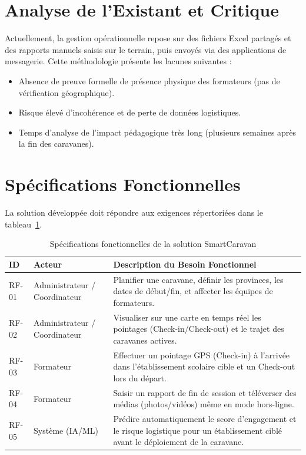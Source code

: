 \documentclass[12pt,a4paper]{report}
\begin{document}
\section{Analyse de l'Existant et Critique}
Actuellement, la gestion opérationnelle repose sur des fichiers Excel partagés et des rapports manuels saisis sur le terrain, puis envoyés via des applications de messagerie. Cette méthodologie présente les lacunes suivantes :
\begin{itemize}
    \item Absence de preuve formelle de présence physique des formateurs (pas de vérification géographique).
    \item Risque élevé d'incohérence et de perte de données logistiques.
    \item Temps d'analyse de l'impact pédagogique très long (plusieurs semaines après la fin des caravanes).
\end{itemize}

\section{Spécifications Fonctionnelles}
La solution développée doit répondre aux exigences répertoriées dans le tableau~\ref{tab:specs_fonc}.

\begin{table}[h]
\centering
\small
\renewcommand{\arraystretch}{1.3}
\begin{tabularx}{\textwidth}{@{} l p{4cm} X @{}}
\toprule
\textbf{ID} & \textbf{Acteur} & \textbf{Description du Besoin Fonctionnel} \\
\midrule
RF-01 & Administrateur / Coordinateur & Planifier une caravane, définir les provinces, les dates de début/fin, et affecter les équipes de formateurs. \\
RF-02 & Administrateur / Coordinateur & Visualiser sur une carte en temps réel les pointages (Check-in/Check-out) et le trajet des caravanes actives. \\
RF-03 & Formateur & Effectuer un pointage GPS (Check-in) à l'arrivée dans l'établissement scolaire cible et un Check-out lors du départ. \\
RF-04 & Formateur & Saisir un rapport de fin de session et téléverser des médias (photos/vidéos) même en mode hors-ligne. \\
RF-05 & Système (IA/ML) & Prédire automatiquement le score d'engagement et le risque logistique pour un établissement ciblé avant le déploiement de la caravane. \\
\bottomrule
\end{tabularx}
\caption{Spécifications fonctionnelles de la solution SmartCaravan}
\label{tab:specs_fonc}
\end{table}
\end{document}

